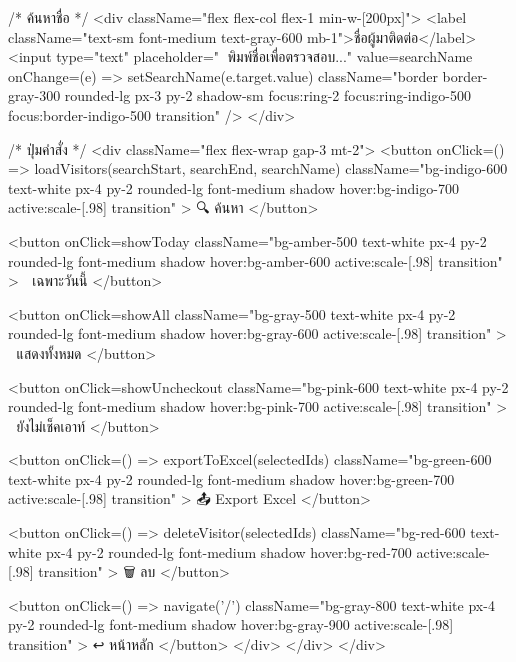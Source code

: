 {          {/* ค้นหาชื่อ */}
          <div className="flex flex-col flex-1 min-w-[200px]">
            <label className="text-sm font-medium text-gray-600 mb-1">ชื่อผู้มาติดต่อ</label>
            <input
              type="text"
              placeholder="🔎 พิมพ์ชื่อเพื่อตรวจสอบ..."
              value={searchName}
              onChange={(e) => setSearchName(e.target.value)}
              className="border border-gray-300 rounded-lg px-3 py-2 shadow-sm focus:ring-2 focus:ring-indigo-500 focus:border-indigo-500 transition"
            />
          </div>

          {/* ปุ่มคำสั่ง */}
          <div className="flex flex-wrap gap-3 mt-2">
            <button
              onClick={() => loadVisitors(searchStart, searchEnd, searchName)}
              className="bg-indigo-600 text-white px-4 py-2 rounded-lg font-medium shadow hover:bg-indigo-700 active:scale-[.98] transition"
            >
              🔍 ค้นหา
            </button>

            <button
              onClick={showToday}
              className="bg-amber-500 text-white px-4 py-2 rounded-lg font-medium shadow hover:bg-amber-600 active:scale-[.98] transition"
            >
              📅 เฉพาะวันนี้
            </button>

            <button
              onClick={showAll}
              className="bg-gray-500 text-white px-4 py-2 rounded-lg font-medium shadow hover:bg-gray-600 active:scale-[.98] transition"
            >
              📄 แสดงทั้งหมด
            </button>

            <button
              onClick={showUncheckout}
              className="bg-pink-600 text-white px-4 py-2 rounded-lg font-medium shadow hover:bg-pink-700 active:scale-[.98] transition"
            >
              🚪 ยังไม่เช็คเอาท์
            </button>

            <button
              onClick={() => exportToExcel(selectedIds)}
              className="bg-green-600 text-white px-4 py-2 rounded-lg font-medium shadow hover:bg-green-700 active:scale-[.98] transition"
            >
              📤 Export Excel
            </button>

            <button
              onClick={() => deleteVisitor(selectedIds)}
              className="bg-red-600 text-white px-4 py-2 rounded-lg font-medium shadow hover:bg-red-700 active:scale-[.98] transition"
            >
              🗑️ ลบ
            </button>

            <button
              onClick={() => navigate('/')}
              className="bg-gray-800 text-white px-4 py-2 rounded-lg font-medium shadow hover:bg-gray-900 active:scale-[.98] transition"
            >
              ↩️ หน้าหลัก
            </button>
          </div>
        </div>
      </div>

}
